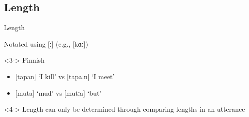 \documentclass{beamer}
\newcommand{\subonetwo}{Length}
\begin{document}
    \subsection{\subonetwo}
      \begin{frame}[t]{\subonetwo}
        \begin{block}{}
          Notated using [ː] (e.g., [kɑː])
        \end{block}
        \begin{example}<3->
          Finnish
          \begin{itemize}
            \item {[}tapan] `I kill' vs [tapaːn] `I meet'
            \item {[}muta] `mud' vs [mutːa] `but'
          \end{itemize}
        \end{example}
        \begin{alertblock}<4->{}
          Length can only be determined through comparing lengths in an utterance
        \end{alertblock}
      \end{frame}
\end{document}
